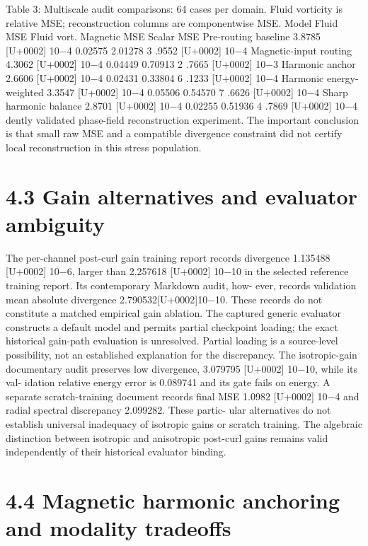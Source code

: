 \documentclass[11pt]{article}
\begin{document}
Table 3: Multiscale audit comparisons: 64 cases per domain. Fluid vorticity is relative MSE;
reconstruction columns are componentwise MSE.
Model Fluid MSE Fluid vort. Magnetic MSE Scalar MSE
Pre-routing baseline 3.8785 [U+0002] 10\ensuremath{-}4 0.02575 2.01278 3 .9552 [U+0002] 10\ensuremath{-}4
Magnetic-input routing 4.3062 [U+0002] 10\ensuremath{-}4 0.04449 0.70913 2 .7665 [U+0002] 10\ensuremath{-}3
Harmonic anchor 2.6606 [U+0002] 10\ensuremath{-}4 0.02431 0.33804 6 .1233 [U+0002] 10\ensuremath{-}4
Harmonic energy-weighted 3.3547 [U+0002] 10\ensuremath{-}4 0.05506 0.54570 7 .6626 [U+0002] 10\ensuremath{-}4
Sharp harmonic balance 2.8701 [U+0002] 10\ensuremath{-}4 0.02255 0.51936 4 .7869 [U+0002] 10\ensuremath{-}4
dently validated phase-field reconstruction experiment. The important conclusion is that small
raw MSE and a compatible divergence constraint did not certify local reconstruction in this stress
population.

\section*{4.3 Gain alternatives and evaluator ambiguity}

The per-channel post-curl gain training report records divergence 1.135488 [U+0002] 10\ensuremath{-}6, larger than
2.257618 [U+0002] 10\ensuremath{-}10 in the selected reference training report. Its contemporary Markdown audit, how-
ever, records validation mean absolute divergence 2.790532[U+0002]10\ensuremath{-}10. These records do not constitute
a matched empirical gain ablation. The captured generic evaluator constructs a default model and
permits partial checkpoint loading; the exact historical gain-path evaluation is unresolved. Partial
loading is a source-level possibility, not an established explanation for the discrepancy.
The isotropic-gain documentary audit preserves low divergence, 3.079795 [U+0002] 10\ensuremath{-}10, while its val-
idation relative energy error is 0.089741 and its gate fails on energy. A separate scratch-training
document records final MSE 1.0982 [U+0002] 10\ensuremath{-}4 and radial spectral discrepancy 2.099282. These partic-
ular alternatives do not establish universal inadequacy of isotropic gains or scratch training. The
algebraic distinction between isotropic and anisotropic post-curl gains remains valid independently
of their historical evaluator binding.

\section*{4.4 Magnetic harmonic anchoring and modality tradeoffs}
\end{document}
